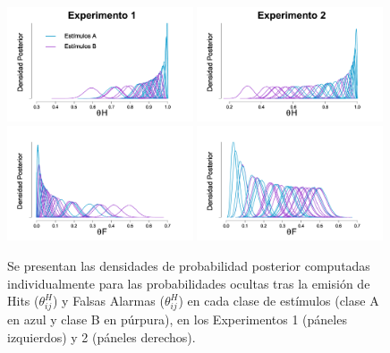 \begin{figure}[bh]
\centering
\includegraphics[width=0.49\textwidth]{Figures/MTau_Hits_E1} 
\includegraphics[width=0.49\textwidth]{Figures/MTau_Hits_E2}\\
\includegraphics[width=0.49\textwidth]{Figures/MTau_FA_E1}
\includegraphics[width=0.49\textwidth]{Figures/MTau_FA_E2}\\
\decoRule
\caption[Modelo Tau: Inferencias individuales para el valor de la probabilidad de cometer un Hit en cada clase de estímulos]{Se presentan las densidades de probabilidad posterior computadas individualmente para las probabilidades ocultas tras la emisión de Hits ($\theta^H_{ij}$) y Falsas Alarmas ($\theta^H_{ij}$) en cada clase de estímulos (clase A en azul y clase B en púrpura), en los Experimentos 1 (páneles izquierdos) y 2 (páneles derechos).}
\label{fig:Tau_Hits}
\end{figure}


